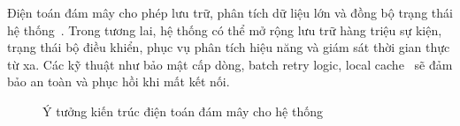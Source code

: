 Điện toán đám mây cho phép lưu trữ, phân tích dữ liệu lớn và đồng bộ trạng thái hệ thống~\cite{Lopez2018}. Trong tương lai, hệ thống có thể mở rộng lưu trữ hàng triệu sự kiện, trạng thái bộ điều khiển, phục vụ phân tích hiệu năng và giám sát thời gian thực từ xa. Các kỹ thuật như bảo mật cấp dòng, batch retry logic, local cache~\cite{Wei2019} sẽ đảm bảo an toàn và phục hồi khi mất kết nối.

\begin{figure}[H]
    \centering
    \caption{Ý tưởng kiến trúc điện toán đám mây cho hệ thống}
\end{figure}
